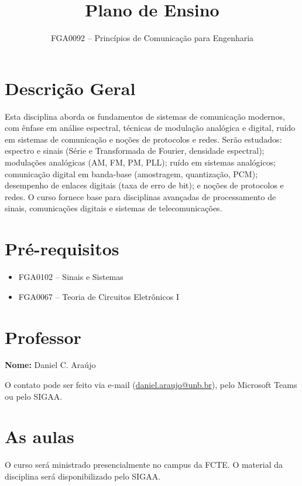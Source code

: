\documentclass[11pt,a4paper]{article}
\title{\textbf{Plano de Ensino}}
\author{FGA0092 -- Princípios de Comunicação para Engenharia}
\date{}
\begin{document}
\thispagestyle{plain}
\maketitle
\vspace{-1.2em}


\vspace{1em}

\section{Descrição Geral}

Esta disciplina aborda os fundamentos de sistemas de comunicação modernos, com ênfase em análise espectral, técnicas de modulação analógica e digital, ruído em sistemas de comunicação e noções de protocolos e redes. Serão estudados: espectro e sinais (Série e Transformada de Fourier, densidade espectral); modulações analógicas (AM, FM, PM, PLL); ruído em sistemas analógicos; comunicação digital em banda-base (amostragem, quantização, PCM); desempenho de enlaces digitais (taxa de erro de bit); e noções de protocolos e redes. O curso fornece base para disciplinas avançadas de processamento de sinais, comunicações digitais e sistemas de telecomunicações.

\section{Pré-requisitos}

\begin{itemize}[noitemsep]
  \item FGA0102 -- Sinais e Sistemas
  \item FGA0067 -- Teoria de Circuitos Eletrônicos I
\end{itemize}

\section{Professor}

\textbf{Nome:} Daniel C. Araújo

O contato pode ser feito via e-mail (\href{mailto:daniel.araujo@unb.br}{daniel.araujo@unb.br}), pelo Microsoft Teams ou pelo SIGAA.

\section{As aulas}

O curso será ministrado presencialmente no campus da FCTE. O material da disciplina será disponibilizado pelo SIGAA.
\end{document}
